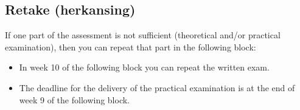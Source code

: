 	\subsection{Retake (herkansing)}
	If one part of the assessment is not sufficient (theoretical and/or practical examination), then you can repeat that part in the following block:
	\begin{itemize}
	\item In week 10 of the following block you can repeat the written exam.
	\item The deadline for the delivery of the practical examination is at the end of week 9 of the following block.
	\end{itemize}
	

